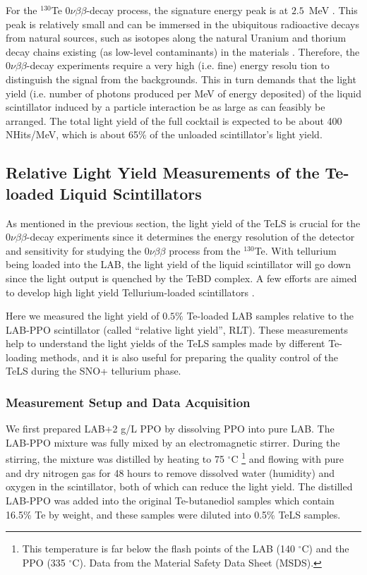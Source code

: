 For the $^{130}${Te} $0\nu\beta\beta$-decay process, the signature energy peak is at $2.5$~MeV \cite{whitepaper}. This peak is relatively small and can be immersed in the ubiquitous radioactive decays from natural sources, such as isotopes along the natural Uranium and thorium decay chains existing (as low-level contaminants) in the materials \cite{whitepaper}. Therefore, the $0\nu\beta\beta$-decay experiments require a very high (i.e. fine) energy resolu tion to distinguish the signal from the backgrounds. This in turn demands that the light yield (i.e. number of photons produced per MeV of energy deposited) of the liquid scintillator induced by a particle interaction be as large as can feasibly be arranged. The total light yield of the full cocktail is expected to be about 400 NHits/MeV, which is about 65\% of the unloaded scintillator's light yield.

\subsection{Relative Light Yield Measurements of the Te-loaded Liquid Scintillators}

As mentioned in the previous section, the light yield of the TeLS is crucial for the $0\nu\beta\beta$-decay experiments since it determines the energy resolution of the detector and sensitivity for studying the $0\nu\beta\beta$ process from the $^{130}$Te. With tellurium being loaded into the LAB, the light yield of the liquid scintillator will go down since the light output is quenched by the TeBD complex. A few efforts are aimed to develop high light yield Tellurium-loaded scintillators \cite{biller2017new}.

Here we measured the light yield of $0.5\%$ Te-loaded LAB samples relative to the LAB-PPO scintillator (called ``relative light yield'', RLT). These measurements help to understand the light yields of the TeLS samples made by different Te-loading methods, and it is also useful for preparing the quality control of the TeLS during the SNO+ tellurium phase.

\subsubsection{Measurement Setup and Data Acquisition}

We first prepared LAB+2 g/L PPO by dissolving PPO into pure LAB. The LAB-PPO mixture was fully mixed by an electromagnetic stirrer. During the stirring, the mixture was distilled by heating to 75 $^\circ$C \footnote{This temperature is far below the flash points of the LAB (140 $^\circ$C) and the PPO (335 $^\circ$C). Data from the Material Safety Data Sheet (MSDS).} and flowing with pure and dry nitrogen gas for 48 hours to remove dissolved water (humidity) and oxygen in the scintillator, both of which can reduce the light yield. The distilled LAB-PPO was added into the original Te-butanediol samples which contain 16.5\% Te by weight, and these samples were diluted into 0.5\% TeLS samples. 

